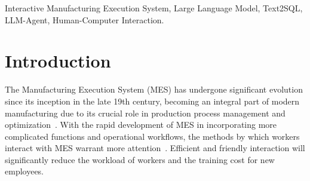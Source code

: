 \documentclass[preprint,12pt]{elsarticle}
\begin{document}
\begin{frontmatter}
\begin{highlights}
\end{highlights}

\begin{keyword}
Interactive Manufacturing Execution System, Large Language Model, Text2SQL, LLM-Agent, Human-Computer Interaction.



\end{keyword}

\end{frontmatter}



\section{Introduction}

The Manufacturing Execution System (MES) has undergone significant evolution since its inception in the late 19th century, becoming an integral part of modern manufacturing due to its crucial role in production process management and optimization~\cite{doi:10.1080/09537280902938613}. 
With the rapid development of MES in incorporating more complicated functions and operational workflows, the methods by which workers interact with MES warrant more attention~\cite{9781176}. 
Efficient and friendly interaction will significantly reduce the workload of workers and the training cost for new employees.

\end{document}
